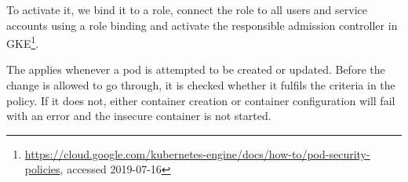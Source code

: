 To activate it, we bind it to a role, connect the role to all users and service accounts using a role binding and activate the responsible admission controller in \ac{GKE}\footnote{\url{https://cloud.google.com/kubernetes-engine/docs/how-to/pod-security-policies}, accessed 2019-07-16}. 

The  applies whenever a pod is attempted to be created or updated. Before the change is allowed to go through, it is checked whether it fulfils the criteria in the policy. If it does not, either container creation or container configuration will fail with an error and the insecure container is not started. 

